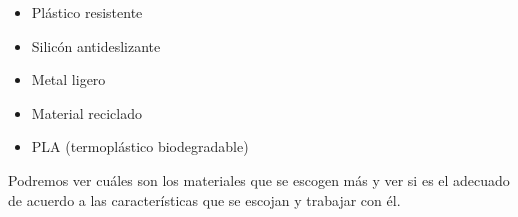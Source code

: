 
\begin{itemize}
    \item Plástico resistente
    \item Silicón antideslizante
    \item Metal ligero
    \item Material reciclado
    \item PLA (termoplástico biodegradable)
\end{itemize}

Podremos ver cuáles son los materiales que se escogen más y ver si es el adecuado de acuerdo a las características que se escojan y trabajar con él.
